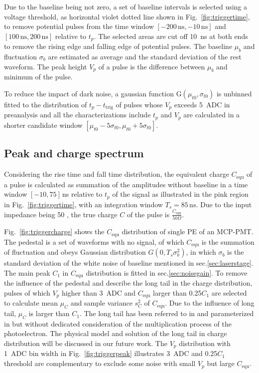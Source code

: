 Due to the baseline being not zero, a set of baseline intervals is selected using a voltage threshold, as horizontal violet dotted line shown in Fig.~\ref{fig:triggertime}, to remove potential pulses from the time window $[-200\,\mathrm{ns},-10\,\mathrm{ns}]$ and $[100\,\mathrm{ns},200\,\mathrm{ns}]$ relative to $t_p$. The selected areas are cut off \SI{10}{ns} at both ends to remove the rising edge and falling edge of potential pulses. The baseline $\mu_b$ and fluctuation $\sigma_b$ are estimated as average and the standard deviation of the rest waveform. The peak height $V_p$ of a pulse is the difference between $\mu_b$ and minimum of the pulse.

To reduce the impact of dark noise, a gaussian function G$(\mu_{t0},\sigma_{t0})$ is unbinned fitted to the distribution of $t_p-t_{\mathrm{trig}}$ of pulses whose $V_p$ exceeds \SI{5}{ADC} in preanalysis and all the characterizations include $t_p$ and $V_p$ are calculated in a shorter candidate window $[\mu_{t0}-5\sigma_{t0}, \mu_{t0}+5\sigma_{t0}]$.

\subsection{Peak and charge spectrum}
\label{sec:noisepeak}

Considering the rise time and fall time distribution, the equivalent charge $C_{\mathrm{equ}}$ of a pulse is calculated as summation of the amplitudes without baseline in a time window $[-10, 75]$\,ns relative to $t_p$ of the signal as illustrated in the pink region in Fig.~\ref{fig:triggertime}, with an integration window $T_s=85\,\mathrm{ns}$. Due to the input impedance being \SI{50}{\Omega} \cite{CAENV1751}, the true charge $C$ of the pulse is $\frac{C_{\mathrm{equ}}}{50 \Omega}$.

Fig.~\ref{fig:triggercharge} shows the $C_{\mathrm{equ}}$ distribution of single PE of an MCP-PMT. The pedestal is a set of waveforms with no signal, of which $C_{\mathrm{equ}}$ is the summation of fluctuation and obeys Gaussian distribution $G(0, T_s\sigma_b^2)$, in which $\sigma_b$ is the standard deviation of the white noise of baseline mentioned in sec.\ref{sec:laserstage}. The  main peak $C_1$ in $C_{\mathrm{equ}}$ distribution is fitted in sec.\ref{sec:noisegain}. To remove the influence of the pedestal and describe the long tail in the charge distribution, pulses of which $V_p$ higher than \SI{3}{ADC} and $C_{\mathrm{equ}}$ larger than 0.25$C_1$ are selected to calculate mean $\mu_{C}$ and sample variance $s^2_{C}$ of $C_{\mathrm{equ}}$. Due to the influence of long tail, $\mu_{C}$ is larger than $C_1$. The long tail has been referred to in \cite{JUNOMassTesting} and parameterized in \cite{JUNOLongtail} but without dedicated consideration of the multiplication process of the photoelectron. The physical model and solution of the long tail in charge distribution will be discussed in our future work. The $V_p$ distribution with \SI{1}{ADC} bin width in Fig.~\ref{fig:triggerpeak} illustrates \SI{3}{ADC} and 0.25$C_1$ threshold are complementary to exclude some noise with small $V_p$ but large $C_{\mathrm{equ}}$.


